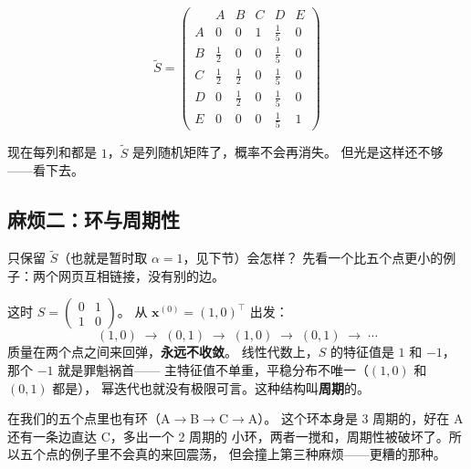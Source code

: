 \documentclass[UTF8,11pt,fontset=macnew]{ctexart}
\newcommand{\xv}{\mathbf{x}}
\begin{document}
\[
\tilde S=\left(\begin{array}{c|ccccc}
   & A & B & C & D & E\\ \hline
A  & 0            & 0            & 1            & \frac15 & 0\\[1mm]
B  & \frac{1}{2}  & 0            & 0            & \frac15 & 0\\[1mm]
C  & \frac{1}{2}  & \frac{1}{2}  & 0            & \frac15 & 0\\[1mm]
D  & 0            & \frac{1}{2}  & 0            & \frac15 & 0\\[1mm]
E  & 0            & 0            & 0            & \frac15 & 1
\end{array}\right)
\]

现在每列和都是 $1$，$\tilde S$ 是列随机矩阵了，概率不会再消失。
但光是这样还不够——看下去。

\subsection{麻烦二：环与周期性}

只保留 $\tilde S$（也就是暂时取 $\alpha=1$，见下节）会怎样？
先看一个比五个点更小的例子：两个网页互相链接，没有别的边。

\begin{center}
\end{center}

这时 $S=\begin{pmatrix}0&1\\1&0\end{pmatrix}$。
从 $\xv^{(0)}=(1,0)^\top$ 出发：
\[
(1,0)\;\to\;(0,1)\;\to\;(1,0)\;\to\;(0,1)\;\to\;\cdots
\]
质量在两个点之间来回弹，\textbf{永远不收敛}。
线性代数上，$S$ 的特征值是 $1$ 和 $-1$，那个 $-1$ 就是罪魁祸首——
主特征值不单重，平稳分布不唯一（$(1,0)$ 和 $(0,1)$ 都是），
幂迭代也就没有极限可言。这种结构叫\textbf{周期}的。

在我们的五个点里也有环（A$\to$B$\to$C$\to$A）。
这个环本身是 3 周期的，好在 A 还有一条边直达 C，多出一个 2 周期的
小环，两者一搅和，周期性被破坏了。所以五个点的例子里不会真的来回震荡，
但会撞上第三种麻烦——更糟的那种。
\end{document}
